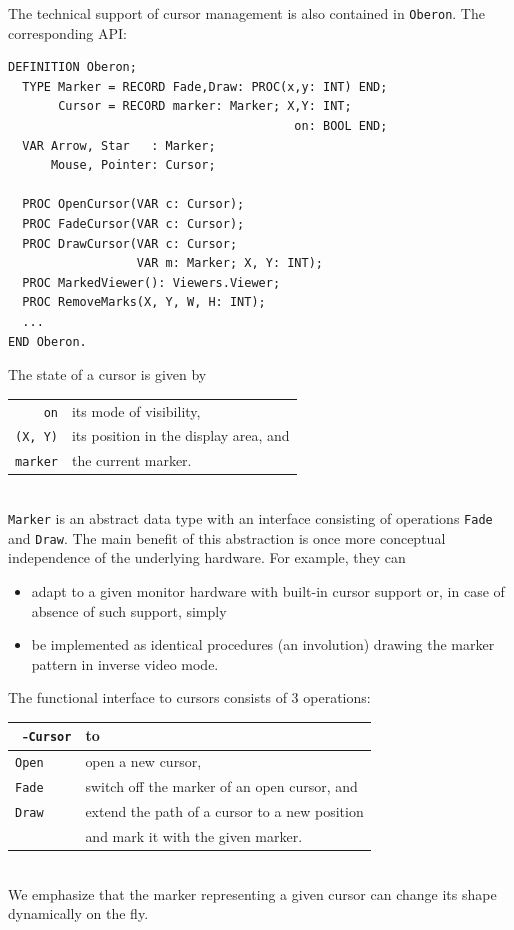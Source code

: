 The technical support of cursor management is also contained in \verb|Oberon|.
The corresponding API:
\begin{verbatim}
DEFINITION Oberon;
  TYPE Marker = RECORD Fade,Draw: PROC(x,y: INT) END;
       Cursor = RECORD marker: Marker; X,Y: INT;
                                        on: BOOL END;
  VAR Arrow, Star   : Marker;
      Mouse, Pointer: Cursor;

  PROC OpenCursor(VAR c: Cursor);
  PROC FadeCursor(VAR c: Cursor);
  PROC DrawCursor(VAR c: Cursor;
                  VAR m: Marker; X, Y: INT);
  PROC MarkedViewer(): Viewers.Viewer;
  PROC RemoveMarks(X, Y, W, H: INT);
  ...
END Oberon.
\end{verbatim}
The state of a cursor is given by
\begin{table}[h!]
  \centering
  \begin{tabular}{r l}
    \verb|on|     & its mode of visibility, \\
    \verb|(X, Y)| & its position in the display area, and \\
    \verb|marker| & the current marker.
  \end{tabular}
\end{table}
\\\verb|Marker| is an abstract data type with an interface consisting of operations
  \verb|Fade| and
  \verb|Draw|.
The main benefit of this abstraction is once more conceptual independence
of the underlying hardware.  For example, they can
\begin{itemize}
  \item adapt to a given monitor hardware with built-in cursor support or,
    in case of absence of such support, simply
  \item be implemented as identical procedures (an involution)
    drawing the marker pattern in inverse video mode.
\end{itemize}

The functional interface to cursors consists of 3 operations:
\begin{table}[h!]
  \centering
  \begin{tabular}{l l}
    ~-\verb|Cursor| & to \\\hline
    \verb|Open| & open a new cursor, \\
    \verb|Fade| & switch off the marker of an open cursor, and \\
    \verb|Draw| & extend the path of a cursor to a new position \\
                & and mark it with the given marker.
  \end{tabular}
\end{table}
\\We emphasize that
the marker representing a given cursor can change its shape dynamically on the fly.


